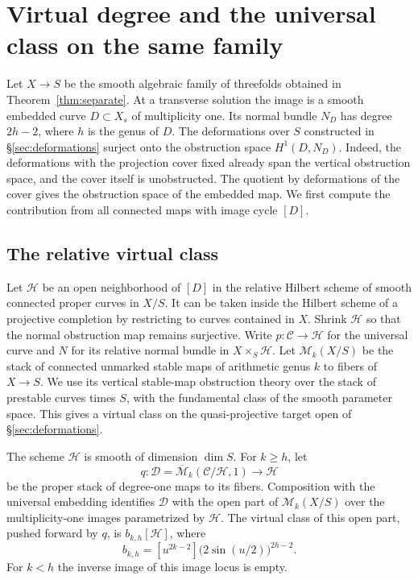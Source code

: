 \section{Virtual degree and the universal class on the same family}\label{sec:comparison}

Let $X\to S$ be the smooth algebraic family of threefolds obtained in
Theorem~\ref{thm:separate}. At a transverse solution the image is a
smooth embedded curve $D\subset X_s$ of multiplicity one. Its normal
bundle $N_D$ has degree $2h-2$, where $h$ is the genus of $D$.
The deformations over $S$ constructed in \S\ref{sec:deformations}
surject onto the obstruction space $H^1(D,N_D)$. Indeed, the
deformations with the projection cover fixed already span the vertical
obstruction space, and the cover itself is unobstructed. The quotient
by deformations of the cover gives the obstruction space of the
embedded map. We first compute the contribution from all connected
maps with image cycle $[D]$.

\subsection{The relative virtual class}

Let $\mathcal H$ be an open neighborhood of $[D]$ in the relative Hilbert
scheme of smooth connected proper curves in $X/S$. It can be taken
inside the Hilbert scheme of a projective completion by restricting
to curves contained in $X$. Shrink $\mathcal H$ so that the normal obstruction
map remains surjective. Write $p:\mathcal C\to \mathcal H$ for the universal
curve and $N$ for its relative normal bundle in $X\times_S \mathcal H$.
Let $\mathcal M_k(X/S)$ be the stack of connected unmarked stable
maps of arithmetic genus $k$ to fibers of $X\to S$. We use its
vertical stable-map obstruction theory over the stack of prestable
curves times $S$, with the fundamental class of the smooth parameter
space. This gives a virtual class on the quasi-projective target
open of \S\ref{sec:deformations}.

\begin{proposition}\label{prop:moving-embedded-curve}
The scheme $\mathcal H$ is smooth of dimension $\dim S$. For $k\ge h$, let
\[
 q:\mathcal D=\overline{\mathcal M}_{k}(\mathcal C/\mathcal H,1)\longrightarrow \mathcal H
\]
be the proper stack of degree-one maps to its fibers. Composition
with the universal embedding identifies $\mathcal D$ with the open
part of $\mathcal M_k(X/S)$ over the multiplicity-one images
parametrized by $\mathcal H$. The virtual class of this open part, pushed
forward by $q$, is $b_{k,h}[\mathcal H]$, where
\begin{equation}\label{eq:embedded-degree-one}
 b_{k,h}=[u^{2k-2}]\bigl(2\sin(u/2)\bigr)^{2h-2}.
\end{equation}
For $k<h$ the inverse image of this image locus is empty.
\end{proposition}

